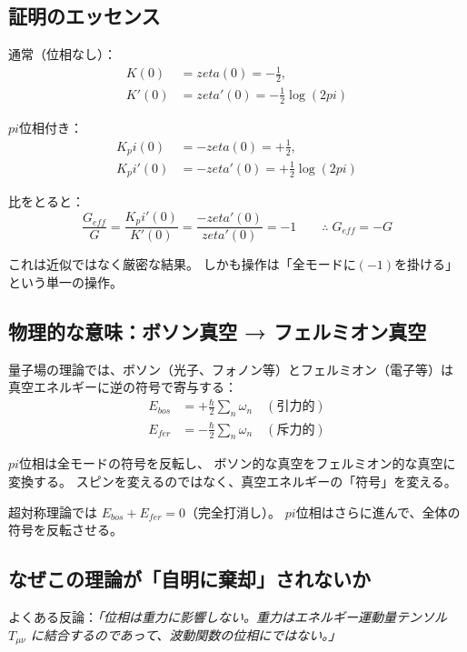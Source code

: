 \documentclass[11pt,a4paper]{article}
\def\pi{pi}%
\def\zeta{zeta}%
\def\mathrm#1{#1}%
\def\textbf#1{#1}%
\begin{document}
\subsection{証明のエッセンス}

通常（位相なし）：
\begin{align}
  K(0) &= \zeta(0) = -\tfrac{1}{2}, \\
  K'(0) &= \zeta'(0) = -\tfrac{1}{2}\log(2\pi)
\end{align}

$\pi$位相付き：
\begin{align}
  K_\pi(0) &= -\zeta(0) = +\tfrac{1}{2}, \\
  K_\pi'(0) &= -\zeta'(0) = +\tfrac{1}{2}\log(2\pi)
\end{align}

比をとると：
\begin{equation}
  \frac{G_{\mathrm{eff}}}{G}
  = \frac{K_\pi'(0)}{K'(0)}
  = \frac{-\zeta'(0)}{\zeta'(0)}
  = -1 \qquad \therefore\; G_{\mathrm{eff}} = -G
\end{equation}

これは近似ではなく\textbf{厳密な結果}。
しかも操作は「全モードに$(-1)$を掛ける」という\textbf{単一の操作}。

\subsection{物理的な意味：ボソン真空 → フェルミオン真空}

量子場の理論では、ボソン（光子、フォノン等）とフェルミオン（電子等）は
真空エネルギーに逆の符号で寄与する：
\begin{align}
  E_{\mathrm{bos}} &= +\frac{\hbar}{2}\sum_n \omega_n \quad (\text{引力的}) \\
  E_{\mathrm{fer}} &= -\frac{\hbar}{2}\sum_n \omega_n \quad (\text{斥力的})
\end{align}

$\pi$位相は全モードの符号を反転し、
ボソン的な真空をフェルミオン的な真空に変換する。
\textbf{スピンを変えるのではなく、真空エネルギーの「符号」を変える。}

超対称理論では $E_{\mathrm{bos}} + E_{\mathrm{fer}} = 0$（完全打消し）。
$\pi$位相はさらに進んで、全体の符号を反転させる。

\subsection{なぜこの理論が「自明に棄却」されないか}

よくある反論：\textit{「位相は重力に影響しない。重力はエネルギー運動量テンソル $T_{\mu\nu}$ に結合するのであって、波動関数の位相にではない。」}
\end{document}
